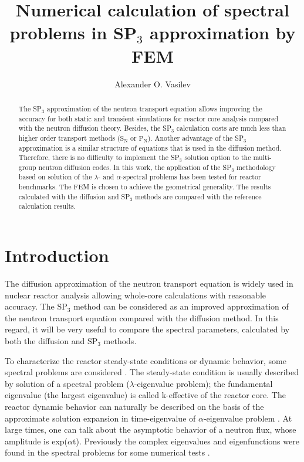 \documentclass[a4paper]{jpconf}
\begin{document}
\title{Numerical calculation of spectral problems in SP$_3$ approximation by FEM}

\author{Alexander O. Vasilev}

\address{North-Eastern Federal University, 58, Belinskogo, Yakutsk, Russia}


\begin{abstract}
The SP$_3$ approximation of the neutron transport equation allows improving the accuracy for both static and transient simulations for reactor core analysis compared with the neutron diffusion theory. 
Besides, the SP$_3$ calculation costs are much less than higher order transport methods ($\mathrm{S_N}$ or $\mathrm{P_N}$). 
Another advantage of the SP$_3$ approximation is a similar structure of equations that is used in the diffusion method. 
Therefore, there is no difficulty to implement the SP$_3$ solution option to the multi-group neutron diffusion codes. 
In this work, the application of the SP$_3$ methodology based on solution of the $\lambda$- and $\alpha$-spectral problems has been tested for reactor benchmarks. 
The FEM is chosen to achieve the geometrical generality. 
The results calculated with the diffusion and SP$_3$ methods are compared with the reference calculation results.
\end{abstract}

\section{Introduction}
The diffusion approximation of the neutron transport equation is widely used in nuclear reactor analysis allowing whole-core calculations with reasonable accuracy. 
The $\mathrm{SP_3}$ \cite{brantley2000simplified} method can be considered as an improved approximation of the neutron transport equation compared with the diffusion method. 
In this regard, it will be very useful to compare the spectral parameters, calculated by both the diffusion and $\mathrm{SP_3}$ methods. 

To characterize the reactor steady-state conditions or dynamic behavior, some spectral problems are considered \cite{stacey2007, bell1970}. 
The steady-state condition is usually described by solution of a spectral problem ($\lambda$-eigenvalue problem); the fundamental eigenvalue (the largest eigenvalue) is called k-effective of the reactor core. 
The reactor dynamic behavior can naturally be described on the basis of the approximate solution expansion in time-eigenvalue of $\alpha$-eigenvalue problem \cite{ginestar2002transient}. 
At large times, one can talk about the asymptotic behavior of a neutron flux, whose amplitude is exp($\alpha$t). 
Previously the complex eigenvalues and eigenfunctions were found in the spectral problems for some numerical tests \cite{avvakumov2017spectral}.
\end{document}
